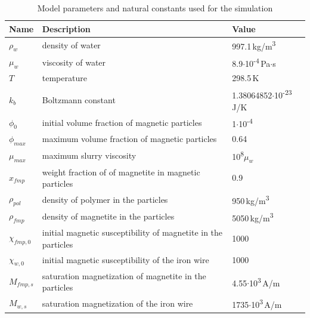 \begin{table}[H]
\centering
\caption[Model parameters]{Model parameters and natural constants used for the simulation}
\label{table:param_mod}
\begin{tabularx}{\textwidth}{XXX}\hline
Name & Description & Value \\
\hline\hline
$\rho_{w}$ & density of water &  997.1\,kg/m\textsuperscript{3}\\
$\mu_{w}$ & viscosity of water & 8.9$\cdotp$10\textsuperscript{-4}\,Pa$\cdotp$s\\
$T$ & temperature & 298.5\,K\\
$k_{b}$ & Boltzmann constant & 1.38064852$\cdotp$10\textsuperscript{-23}\,J/K\\
$\phi_{0}$ & initial volume fraction of magnetic particles & 1$\cdotp$10\textsuperscript{-4}\\
$\phi_{max}$ & maximum volume fraction of magnetic particles & 0.64\\
$\mu_{max}$ & maximum slurry viscosity & 10\textsuperscript{8}$\mu_{w}$\\
$x_{fmp}$ & weight fraction of of magnetite in magnetic particles & 0.9\\
$\rho_{pol}$ & density of polymer in the particles & 950\,kg/m\textsuperscript{3}\\
$\rho_{fmp}$ & density of magnetite in the particles & 5050\,kg/m\textsuperscript{3}\\
$\chi_{fmp,0}$ & initial magnetic susceptibility of magnetite in the particles & 1000\\
$\chi_{w,0}$ & initial magnetic susceptibility of the iron wire & 1000\\
$M_{fmp,s}$ & saturation magnetization of magnetite in the particles & 4.55$\cdotp$10\textsuperscript{3}\,A/m\\
$M_{w,s}$ & saturation magnetization of the iron wire & 1735$\cdotp$10\textsuperscript{3}\,A/m\\
\hline
\end{tabularx}
\end{table}

